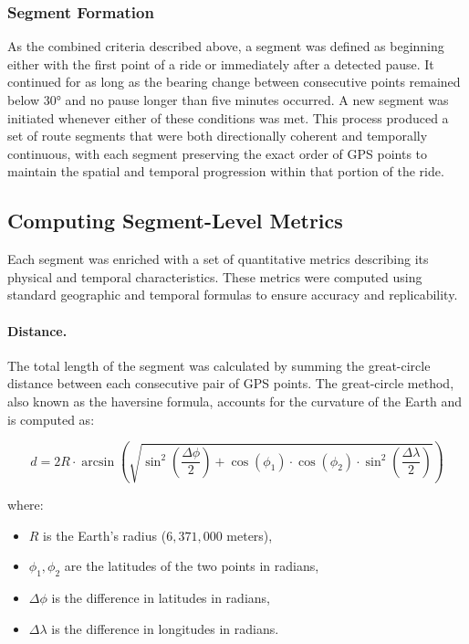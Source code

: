 \subsubsection{Segment Formation}
As the combined criteria described above, a segment was defined as beginning either with the first point of a ride or immediately after a detected pause. It continued for as long as the bearing change between consecutive points remained below 30° and no pause longer than five minutes occurred. A new segment was initiated whenever either of these conditions was met. This process produced a set of route segments that were both directionally coherent and temporally continuous, with each segment preserving the exact order of GPS points to maintain the spatial and temporal progression within that portion of the ride.

\subsection{Computing Segment-Level Metrics}
Each segment was enriched with a set of quantitative metrics describing its physical and temporal characteristics. These metrics were computed using standard geographic and temporal formulas to ensure accuracy and replicability.

\paragraph{Distance.} 
The total length of the segment was calculated by summing the great-circle distance between each consecutive pair of GPS points. The great-circle method, also known as the haversine formula, accounts for the curvature of the Earth and is computed as:

\begin{equation}
d = 2R \cdot \arcsin \left( 
\sqrt{ \sin^2\left( \frac{\Delta\phi}{2} \right) 
+ \cos(\phi_1) \cdot \cos(\phi_2) \cdot \sin^2\left( \frac{\Delta\lambda}{2} \right) }
\right)
\end{equation}

where:
\begin{itemize}
    \item $R$ is the Earth's radius ($6,371,000$ meters),
    \item $\phi_1, \phi_2$ are the latitudes of the two points in radians,
    \item $\Delta\phi$ is the difference in latitudes in radians,
    \item $\Delta\lambda$ is the difference in longitudes in radians.
\end{itemize}

